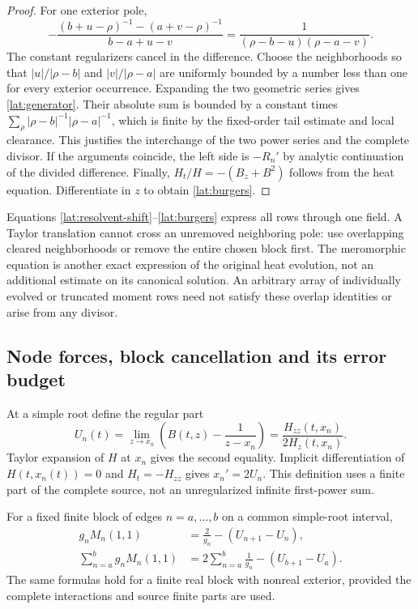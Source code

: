 \begin{proof}
For one exterior pole,
\[
 -\frac{(b+u-\rho)^{-1}-(a+v-\rho)^{-1}}
        {b-a+u-v}
 =\frac1{(\rho-b-u)(\rho-a-v)}.
\]
The constant regularizers cancel in the difference. Choose the
neighborhoods so that $|u|/|\rho-b|$ and $|v|/|\rho-a|$ are
uniformly bounded by a number less than one for every exterior
occurrence. Expanding the two geometric series gives
\eqref{lat:generator}. Their absolute sum is bounded by a constant
times $\sum_\rho|\rho-b|^{-1}|\rho-a|^{-1}$, which is finite by
the fixed-order tail estimate and local clearance. This justifies
the interchange of the two power series and the complete divisor.
If the arguments coincide, the left side is $-R_n'$ by analytic
continuation of the divided difference. Finally,
$H_t/H=-(B_z+B^2)$ follows from the heat equation. Differentiate
in $z$ to obtain \eqref{lat:burgers}.
\end{proof}

Equations \eqref{lat:resolvent-shift}--\eqref{lat:burgers} express
all rows through one field. A Taylor translation cannot cross an
unremoved neighboring pole: use overlapping cleared neighborhoods
or remove the entire chosen block first. The meromorphic equation
is another exact expression of the original heat evolution, not an
additional estimate on its canonical solution. An arbitrary array
of individually evolved or truncated moment rows need not satisfy
these overlap identities or arise from any divisor.

\subsection{Node forces, block cancellation and its error budget}

At a simple root define the regular part
\begin{equation}
 U_n(t)=\lim_{z\to x_n}
       \left(B(t,z)-\frac1{z-x_n}\right)
       =\frac{H_{zz}(t,x_n)}{2H_z(t,x_n)}.
 \label{lat:node-force}
\end{equation}
Taylor expansion of $H$ at $x_n$ gives the second equality. Implicit
differentiation of $H(t,x_n(t))=0$ and $H_t=-H_{zz}$ gives
$x_n'=2U_n$. This definition uses a finite part of the complete
source, not an unregularized infinite first-power sum.

\begin{proposition}\label{lat:flux-prop}
For a fixed finite block of edges $n=a,\ldots,b$ on a common
simple-root interval,
\begin{align}
 g_nM_n(1,1)&=\frac2{g_n}-(U_{n+1}-U_n),
                         \label{lat:edge-flux}\\
 \sum_{n=a}^{b}g_nM_n(1,1)
 &=2\sum_{n=a}^{b}\frac1{g_n}-(U_{b+1}-U_a).
                         \label{lat:block-flux}
\end{align}
The same formulas hold for a finite real block with nonreal exterior,
provided the complete interactions and source finite parts are used.
\end{proposition}

